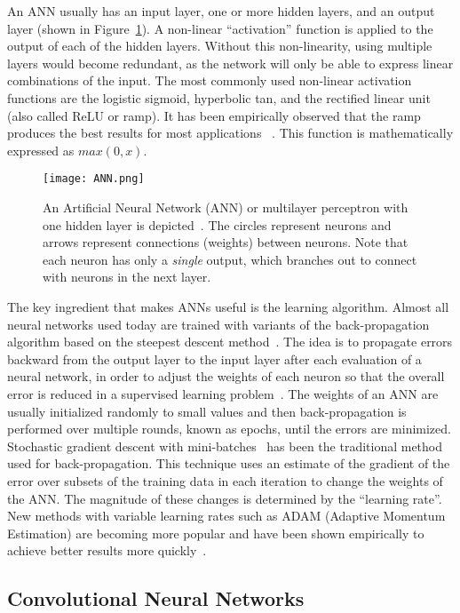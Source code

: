\documentclass[aps,prd,%
amsmath,floats,floatfix, twocolumn, superscriptaddress,nofootinbib,showpacs]{revtex4-1}
\begin{document}
An ANN usually has an input layer, one or more hidden layers, and an output layer (shown in Figure~\ref{fig:NN}). A non-linear ``activation'' function is applied to the output of each of the hidden layers. Without this non-linearity, using multiple layers would become redundant, as the network will only be able to express linear combinations of the input. The most commonly used non-linear activation functions are the logistic sigmoid, hyperbolic tan, and the rectified linear unit (also called ReLU or ramp). It has been empirically observed that the ramp produces the best results for most applications~\cite{ReLU} . This function is mathematically expressed as $max(0,x)$.

\begin{figure}
	\centering
	\texttt{[image: ANN.png]}
	\caption{An Artificial Neural Network (ANN) or multilayer perceptron with one hidden layer is depicted~\cite{picANN}. The circles represent neurons and arrows represent connections (weights) between neurons. Note that each neuron has only a \textit{single} output, which branches out to connect with neurons in the next layer.
	}
	\label{fig:NN}
\end{figure}

The key ingredient that makes ANNs useful is the learning algorithm. Almost all neural networks used today are trained with variants of the back-propagation algorithm based on the steepest descent method~\cite{DL-Review}. The idea is to propagate errors backward from the output layer to the input layer after each evaluation of a neural network, in order to adjust the weights of each neuron so that the overall error is reduced in a supervised learning problem~\cite{BackProp}. The weights of an ANN are usually initialized randomly to small values and then back-propagation is performed over multiple rounds, known as epochs, until the errors are minimized. Stochastic gradient descent with mini-batches~\cite{SGD} has been the traditional method used for back-propagation. This technique uses an estimate of the gradient of the error over subsets of the training data in each iteration to change the weights of the ANN. The magnitude of these changes is determined by the ``learning rate''. New methods with variable learning rates such as ADAM (Adaptive Momentum Estimation) are becoming more popular and have been shown empirically to achieve better results more quickly~\cite{ADAM}.

\subsection*{Convolutional Neural Networks}
\end{document}
